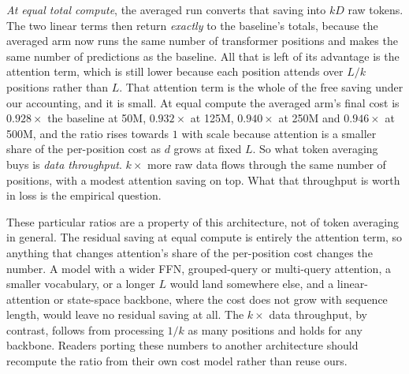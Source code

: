 \documentclass[11pt]{article}
\newcommand{\Ltr}{L}            %
\begin{document}
\emph{At equal total compute}, the averaged run converts that saving into
$kD$ raw tokens. The two linear terms then return \emph{exactly} to the
baseline's totals, because the averaged arm now runs the same number of
transformer positions and makes the same number of predictions as the
baseline. All that is left of its advantage is the attention term, which is
still lower because each position attends over $\Ltr/k$ positions rather than
$\Ltr$. That attention term is the whole of the free saving under our
accounting, and it is small. At equal compute the averaged arm's final cost is
$0.928\times$ the baseline at 50M, $0.932\times$ at 125M, $0.940\times$ at
250M and $0.946\times$ at 500M, and the ratio rises towards $1$ with scale
because attention is a smaller share of the per-position cost as $d$ grows at
fixed $\Ltr$. So what token averaging buys is \emph{data throughput}.
$k\times$ more raw data flows through the same number of positions, with a
modest attention saving on top. What that throughput is worth in loss is the
empirical question.

These particular ratios are a property of this architecture, not of token
averaging in general. The residual saving at equal compute is entirely the
attention term, so anything that changes attention's share of the per-position
cost changes the number. A model with a wider FFN, grouped-query or
multi-query attention, a smaller vocabulary, or a longer $\Ltr$ would land
somewhere else, and a linear-attention or state-space backbone, where the cost
does not grow with sequence length, would leave no residual saving at all. The
$k\times$ data throughput, by contrast, follows from processing $1/k$ as many
positions and holds for any backbone. Readers porting these numbers to another
architecture should recompute the ratio from their own cost model rather than
reuse ours.
\end{document}
